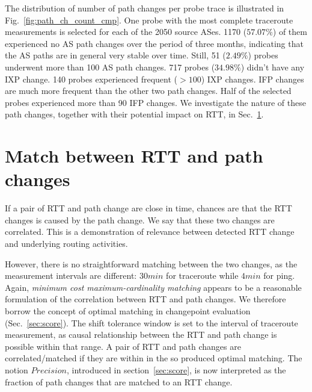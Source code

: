 The distribution of number of path changes per probe trace
is illustrated in Fig.~\ref{fig:path_ch_count_cmp}.
One probe with the most complete traceroute measurements is selected for each of the 2050 source ASes.
1170 ($57.07\%$) of them experienced no AS path changes over the period of three months, indicating that the AS paths are in general very stable over time.
Still, 51 ($2.49\%$) probes underwent more than 100 AS path changes.
717 probes ($34.98\%$) didn't have any IXP change.
140 probes experienced frequent ($> 100$) IXP changes.
IFP changes are much more frequent than the other two path changes. 
Half of the selected probes experienced more than 90 IFP changes.
We investigate the nature of these path changes, together with their potential impact on RTT, in Sec.~\ref{sec:corr}.

\section{Match between RTT and path changes}
\label{sec:corr}

If a pair of RTT and path change are close in time, chances are that the RTT changes is caused by the path change. We say that these two changes are correlated. This is a demonstration of relevance between detected RTT change and underlying routing activities.

However, there is no straightforward matching between the two changes, as the measurement intervals are different: $30min$ for traceroute while $4min$ for ping. 
Again, \textit{minimum cost maximum-cardinality matching} appears to be a reasonable formulation of the correlation between RTT and path changes.
We therefore borrow the concept of optimal matching in changepoint evaluation (Sec.~\ref{sec:score}).
The shift tolerance window is set to the interval of traceroute measurement, as causal relationship between the RTT and path change is possible within that range.
A pair of RTT and path changes are correlated/matched if they are within in the so produced optimal matching.
The notion $Precision$, introduced in section~\ref{sec:score}, is now interpreted as the fraction of path changes that are matched to an RTT change. 

